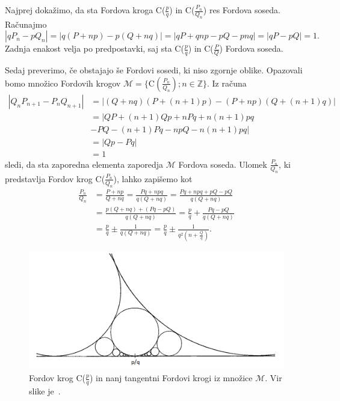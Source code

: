 \documentclass[mat1]{fmfdelo}
\newcommand{\Z}{\mathbb Z}
\begin{document}
\begin{dokaz}
%
Najprej dokažimo, da sta Fordova kroga C($\frac{p}{q}$) in C($\frac{P_n}{Q_n}$) res Fordova soseda. Računajmo
\[ |qP_{n} - pQ_{n}| = |q(P+np) - p(Q+nq)| = |qP+qnp-pQ-pnq| = |qP-pQ| = 1. \]
Zadnja enakost velja po predpostavki, saj sta C($\frac{p}{q}$) in C($\frac{P}{Q}$) Fordova soseda.

Sedaj preverimo, če obstajajo še Fordovi sosedi, ki niso zgornje oblike. Opazovali bomo množico Fordovih krogov $\mathcal{M} = \{ \mathrm{C}(\frac{P_n}{Q_n}); n\in\Z \}.$
Iz računa
\begin{align}
|Q_{n}P_{n+1} - P_{n}Q_{n+1}| 
  &= |(Q+nq)(P+(n+1)p) - (P+np)(Q+(n+1)q)| \nonumber \\ 
  &= |QP + (n+1)Qp + nPq + n(n+1)pq \nonumber \\
  &   - PQ - (n+1)Pq - npQ - n(n+1)pq| \nonumber \\
  &= |Qp - Pq| \nonumber \\
  &= 1
\end{align}
sledi, da sta zaporedna elementa zaporedja $\mathcal{M}$ Fordova soseda. Ulomek $\frac{P_n}{Q_n}$, ki predstavlja Fordov krog C($\frac{P_n}{Q_n}$), lahko zapišemo kot
\begin{align}
\frac{P_n}{Q_n}
  &= \frac{P+np}{Q+nq} = \frac{Pq+npq}{q(Q+nq)} = \frac{Pq+npq+pQ-pQ}{q(Q+nq)} \nonumber \\
  &= \frac{p(Q+nq) + (Pq-pQ)}{q(Q+nq)} = \frac{p}{q} + \frac{Pq-pQ}{q(Q+nq)} \nonumber \\
  &= \frac{p}{q} \pm \frac{1}{q(Q+nq)} = \frac{p}{q} \pm \frac{1}{q^2 \left (n+\frac{Q}{q} \right)}.
\end{align}
%
\begin{figure}[h!]
\begin{center}
\includegraphics[scale=0.4]{ford_obroc.png}
\caption{Fordov krog C($\frac{p}{q}$) in nanj tangentni Fordovi krogi iz množice $\mathcal{M}$. Vir slike je~\cite[poglavje 2, Figure 2, str.~589]{ford}.}

\end{center}
\end{figure}
\end{dokaz}
\end{document}
